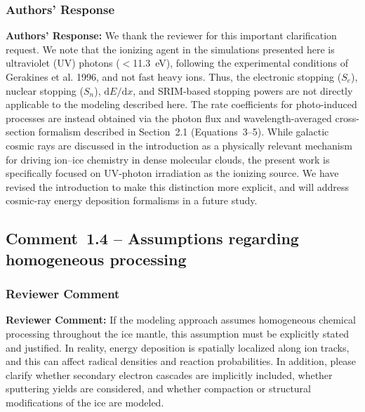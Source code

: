 \documentclass[12pt]{article}
\newcommand{\reviewlabel}{\textbf{\textcolor{commentframe}{Reviewer Comment:}}}
\newcommand{\responselabel}{\textbf{\textcolor{responseframe}{Authors' Response:}}}
\begin{document}
\subsubsection{Authors' Response}
\begin{responsebox}
\responselabel{} We thank the reviewer for this important clarification
request. We note that the ionizing agent in the simulations presented here is
ultraviolet (UV) photons ($<$11.3~eV), following the experimental conditions
of Gerakines et al. 1996, and not fast heavy ions. Thus, the electronic stopping ($S_e$), nuclear stopping ($S_n$),
$\mathrm{d}E/\mathrm{d}x$, and SRIM-based stopping powers are not directly
applicable to the modeling described here. The rate
coefficients for photo-induced processes are instead obtained via the photon
flux and wavelength-averaged cross-section formalism described in
Section~2.1 (Equations~3--5). While galactic cosmic rays are discussed in the
introduction as a physically relevant mechanism for driving ion--ice chemistry in dense molecular clouds, the present work is specifically focused on UV-photon irradiation as the ionizing source. We have revised the introduction to make this distinction more explicit, and will address cosmic-ray energy deposition formalisms in a future study.
\end{responsebox}

\subsection{Comment~1.4 -- Assumptions regarding homogeneous processing}

\subsubsection{Reviewer Comment}
\begin{reviewerbox}
\reviewlabel{} If the modeling approach assumes homogeneous chemical
processing throughout the ice mantle, this assumption must be explicitly
stated and justified. In reality, energy deposition is spatially localized
along ion tracks, and this can affect radical densities and reaction
probabilities. In addition, please clarify whether secondary electron cascades
are implicitly included, whether sputtering yields are considered, and whether
compaction or structural modifications of the ice are modeled.
\end{reviewerbox}
\end{document}
